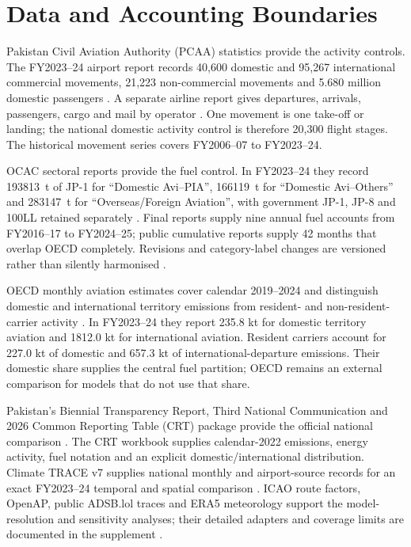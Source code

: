 \section{Data and Accounting Boundaries}
\label{sec:data}

Pakistan Civil Aviation Authority (PCAA) statistics provide the activity controls. The
FY2023--24 airport report records 40,600 domestic and 95,267 international commercial
movements, 21,223 non-commercial movements and 5.680 million domestic passengers
\citep{pcaaairports2024}. A separate airline report gives departures, arrivals, passengers,
cargo and mail by operator \citep{pcaaairlines2024}. One movement is one take-off or landing;
the national domestic activity control is therefore 20,300 flight stages. The historical
movement series covers FY2006--07 to FY2023--24.

OCAC sectoral reports provide the fuel control. In FY2023--24 they record
\SI{193813}{\tonne} of JP-1 for ``Domestic Avi--PIA'', \SI{166119}{\tonne} for ``Domestic
Avi--Others'' and \SI{283147}{\tonne} for ``Overseas/Foreign Aviation'', with government
JP-1, JP-8 and 100LL retained separately \citep{ocacaviation}. Final reports supply nine annual
fuel accounts from FY2016--17 to FY2024--25; public cumulative reports supply 42 months that
overlap OECD completely. Revisions and category-label changes are versioned rather than
silently harmonised \citep{ocacarchive}.

OECD monthly aviation estimates cover calendar 2019--2024 and distinguish domestic and
international territory emissions from resident- and non-resident-carrier activity
\citep{oecdaviation}. In FY2023--24 they report 235.8 kt \COtwo{} for domestic territory
aviation and 1812.0 kt for international aviation. Resident carriers account for 227.0 kt of
domestic and 657.3 kt of international-departure emissions. Their domestic share supplies the
central fuel partition; OECD remains an external comparison for models that do not use that
share.

Pakistan's Biennial Transparency Report, Third National Communication and 2026 Common
Reporting Table (CRT) package provide the official national comparison
\citep{pakbtr2024,paknc32025,pakcrt2026}. The CRT workbook supplies calendar-2022 emissions,
energy activity, fuel notation and an explicit domestic/international distribution. Climate
TRACE v7 supplies national monthly and airport-source records for an exact FY2023--24 temporal
and spatial comparison \citep{climatetrace}. ICAO route factors, OpenAP, public ADSB.lol traces
and ERA5 meteorology support the model-resolution and sensitivity analyses; their detailed
adapters and coverage limits are documented in the supplement
\citep{sun2020openap,adsblolhistory,era5arco}.

